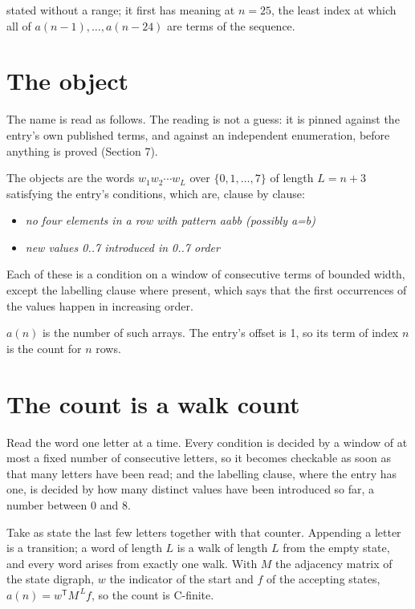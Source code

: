 \documentclass[11pt]{article}
\theoremstyle{definition}
\begin{document}
stated without a range; it first has meaning at $n = 25$, the least index at which all of $a(n-1),\dots,a(n-24)$ are terms of the sequence.

\section{The object}

The name is read as follows. The reading is not a guess: it is pinned against the entry's own published terms, and against an independent enumeration, before anything is proved (Section 7).

The objects are the words $w_1 w_2 \cdots w_L$ over $\{0,1,\dots,7\}$ of length $L = n + 3$ satisfying the entry's conditions, which are, clause by clause:

\begin{itemize}

\item {\itshape no four elements in a row with pattern aabb (possibly a=b)}

\item {\itshape new values 0..7 introduced in 0..7 order}

\end{itemize}

Each of these is a condition on a window of consecutive terms of bounded width, except the labelling clause where present, which says that the first occurrences of the values happen in increasing order.

$a(n)$ is the number of such arrays. The entry's offset is 1, so its term of index $n$ is the count for $n$ rows.

\section{The count is a walk count}

Read the word one letter at a time. Every condition is decided by a window of at most a fixed number of consecutive letters, so it becomes checkable as soon as that many letters have been read; and the labelling clause, where the entry has one, is decided by how many distinct values have been introduced so far, a number between $0$ and 8.

Take as state the last few letters together with that counter. Appending a letter is a transition; a word of length $L$ is a walk of length $L$ from the empty state, and every word arises from exactly one walk. With $M$ the adjacency matrix of the state digraph, $w$ the indicator of the start and $f$ of the accepting states, $a(n) = w^{\mathsf T}M^{\,L}f$, so the count is C-finite.
\end{document}
